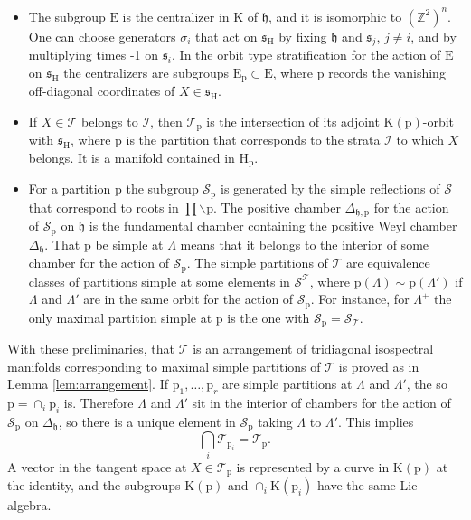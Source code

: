\documentclass[reqno]{amsart}
\newcommand{\p}{\mathrm{p}}
\renewcommand{\gg}{\mathfrak{g}}
\newcommand{\hh}{\mathfrak{h}}
\renewcommand{\ss}{\mathfrak{s}}
\newcommand{\cI}{\mathcal{I}}
\newcommand{\cS}{\mathcal{S}}
\newcommand{\cT}{\mathcal{T}}
\newcommand{\E}{\mathrm{E}}
\newcommand{\K}{\mathrm{K}}
\renewcommand{\H}{\mathrm{H}}
\begin{document}
\begin{itemize}
 Our notation deviates from Davis' in the sense that we use the complementary subset of roots. (We do it to work with usual partitions of an ordered set). In particular, our notation $\p\cap \p'$ corresponds to the intersection of the complementary subsets of roots.  Also, we do not work with the semisimple part $\gg(\p)$, which is a split real semisimple Lie algebra. The reason is that we consider the adjoint action of $\K(\p)$ on $\gg(\p)$, which factors through the center.
 \item The subgroup $\E$ is the centralizer in $\K$ of $\hh$, and it is isomorphic to ${(\mathbb{Z}^2)}^n$. One can choose generators
$\sigma_i$ that act on $\ss_\H$ by fixing $\hh$ and $\ss_{j}$, $j\neq i$, and by multiplying times -1  on  $\ss_i$. In the orbit type stratification for the action of $\E$ on $\ss_\H$ the centralizers
are subgroups $\E_\p\subset \E$, where $\p$ records the vanishing off-diagonal coordinates of $X\in \ss_\H$.
\item  If $X\in \cT$ belongs to $\cI$, then $\cT_\p$ is the intersection of its adjoint  $\K(\p)$-orbit with $\ss_\H$, where $\p$ is the partition that corresponds to the strata $\cI$ to which $X$ belongs. It is a manifold contained in $\H_\p$.
\item  For a partition $\p$ the subgroup $\cS_\p$ is generated by  the simple reflections of $\cS$ that correspond to roots in $\prod\backslash \p$. The positive chamber $\Delta_{\hh,\p}$  for the action of $\cS_\p$ on $\hh$ is the fundamental chamber containing the positive Weyl chamber $\Delta_{\hh}$.
That $\p$ be simple at $\Lambda$ means that it belongs to the interior of some chamber for the action of $\cS_\p$.
The simple partitions of $\cT$ are equivalence classes of partitions simple at some elements in $\cS^{\cT}$, where $\p(\Lambda)\sim \p(\Lambda')$ if $\Lambda$ and $\Lambda'$ are in the same orbit for the action of $\cS_\p$. For instance, for $\Lambda^+$ the only maximal partition simple at $\p$ is the one with $\cS_\p=\cS_\cT$.
\end{itemize}

With these preliminaries, that $\cT$ is an arrangement of tridiagonal isospectral manifolds  corresponding to maximal simple partitions of $\cT$ is proved as in Lemma \ref{lem:arrangement}.
If $\p_1,\dots,\p_r$ are simple partitions at $\Lambda$ and $\Lambda'$, the so $\p=\cap_i\p_i$ is. Therefore $\Lambda$ and $\Lambda'$ sit in the interior of chambers for the action of $\cS_{\p}$ on $\Delta_\hh$, so there is a unique element in  $\cS_{\p}$ taking $\Lambda$ to $\Lambda'$. This implies
\[\bigcap_i\cT_{\p_i}=\cT_{\p}.\]
A vector in the tangent space at $X\in \cT_\p$ is represented by a curve  in $\K(\p)$ at the identity, and the subgroups $\K(\p)$ and $\cap_i \K(\p_i)$ have the same Lie algebra.
\end{document}
